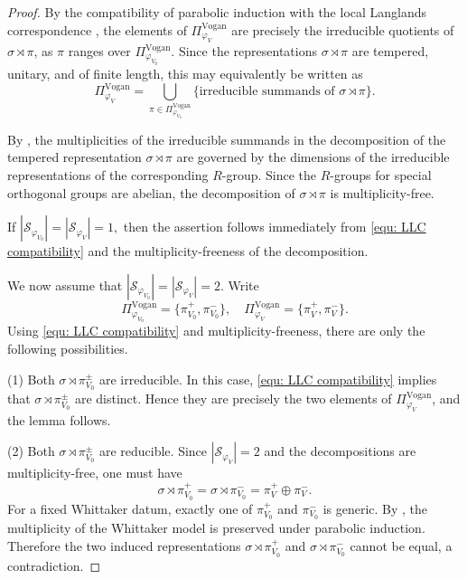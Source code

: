 \documentclass[12pt]{amsart}
\numberwithin{equation}{subsection}
\newcommand{\CS}{{\mathcal {S}}}
\def\vphi{\varphi}
\begin{document}
\begin{proof}
By the compatibility of parabolic induction with the local Langlands correspondence \cite[Defin.~4.10]{adams2016contragredient}, the elements of $\Pi_{\varphi_{V}}^{\mathrm{Vogan}}$ are precisely the irreducible quotients of $\sigma\rtimes \pi$, as $\pi$ ranges over $\Pi_{\varphi_{V_0}}^{\mathrm{Vogan}}$. Since the representations $\sigma\rtimes \pi$ are tempered, unitary, and of finite length, this may equivalently be written as
\begin{equation}\label{equ: LLC compatibility}
\Pi_{\varphi_{V}}^{\mathrm{Vogan}}=
\bigcup_{\pi\in \Pi_{\varphi_{V_0}}^{\mathrm{Vogan}}}
\{\text{irreducible summands of }\sigma\rtimes \pi\}.
\end{equation}

By \cite[Properties~1.1(1)]{ban2007r}, the multiplicities of the irreducible summands in the decomposition of the tempered representation $\sigma\rtimes \pi$ are governed by the dimensions of the irreducible representations of the corresponding $R$-group. Since the $R$-groups for special orthogonal groups are abelian, the decomposition of $\sigma\rtimes \pi$ is multiplicity-free.

If
$
|\CS_{\varphi_{V_0}}|=|\CS_{\varphi_{V}}|=1,
$
then the assertion follows immediately from \eqref{equ: LLC compatibility} and the multiplicity-freeness of the decomposition.

We now assume that
$
|\CS_{\varphi_{V_0}}|=|\CS_{\varphi_{V}}|=2.
$
Write
\[
\Pi_{\varphi_{V_0}}^{\mathrm{Vogan}}=\{\pi_{V_0}^+, \pi_{V_0}^-\},\quad
\Pi_{\varphi_{V}}^{\mathrm{Vogan}}=\{\pi_{V}^+, \pi_{V}^-\}.
\]
Using \eqref{equ: LLC compatibility} and multiplicity-freeness, there are only the following possibilities.

(1) Both $\sigma\rtimes \pi_{V_0}^\pm$ are irreducible. In this case, \eqref{equ: LLC compatibility} implies that $\sigma\rtimes \pi_{V_0}^\pm$ are distinct. Hence they are precisely the two elements of $\Pi_{\varphi_{V}}^{\mathrm{Vogan}}$, and the lemma follows.

(2) Both $\sigma\rtimes \pi_{V_0}^\pm$ are reducible. Since $|\CS_{\vphi_V}|=2$ and the decompositions are multiplicity-free, one must have
    \[
    \sigma\rtimes \pi_{V_0}^+=\sigma\rtimes \pi_{V_0}^-=\pi_{V}^+\oplus\pi_{V}^-.
    \]
    For a fixed Whittaker datum, exactly one of $\pi_{V_0}^+$ and $\pi_{V_0}^-$ is generic. By \cite[Cor.~7.3.1]{thesis_zhilin}, the multiplicity of the Whittaker model is preserved under parabolic induction. Therefore the two induced representations $\sigma\rtimes \pi_{V_0}^+$ and $\sigma\rtimes \pi_{V_0}^-$ cannot be equal, a contradiction.


\end{proof}
\end{document}
